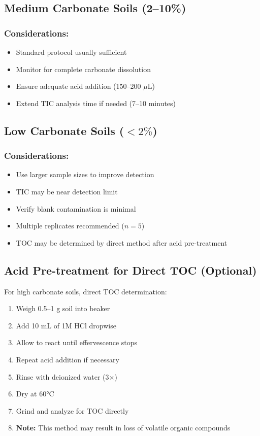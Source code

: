 \documentclass[11pt,a4paper]{article}\usepackage[]{graphicx}\usepackage[]{xcolor}
\begin{document}
\subsection{Medium Carbonate Soils (2--10\%)}

\subsubsection{Considerations:}
\begin{itemize}[noitemsep]
    \item Standard protocol usually sufficient
    \item Monitor for complete carbonate dissolution
    \item Ensure adequate acid addition (150--200 $\mu$L)
    \item Extend TIC analysis time if needed (7--10 minutes)
\end{itemize}

\subsection{Low Carbonate Soils ($<2\%$)}

\subsubsection{Considerations:}
\begin{itemize}[noitemsep]
    \item Use larger sample sizes to improve detection
    \item TIC may be near detection limit
    \item Verify blank contamination is minimal
    \item Multiple replicates recommended ($n=5$)
    \item TOC may be determined by direct method after acid pre-treatment
\end{itemize}

\subsection{Acid Pre-treatment for Direct TOC (Optional)}

For high carbonate soils, direct TOC determination:
\begin{enumerate}[noitemsep]
    \item Weigh 0.5--1 g soil into beaker
    \item Add 10 mL of 1M HCl dropwise
    \item Allow to react until effervescence stops
    \item Repeat acid addition if necessary
    \item Rinse with deionized water (3$\times$)
    \item Dry at 60°C
    \item Grind and analyze for TOC directly
    \item \textbf{Note:} This method may result in loss of volatile organic compounds
\end{enumerate}
\end{document}

